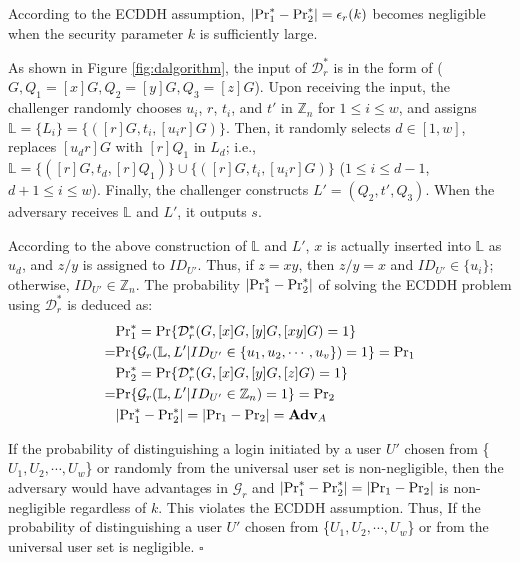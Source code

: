 {According to the ECDDH assumption,
    $|{\rm Pr}^*_1 - {\rm Pr}^*_2| = \epsilon_{r}(k)$ becomes negligible when the security parameter $k$ is sufficiently large.

As shown in Figure \ref{fig:dalgorithm}, the input of $\mathcal{D}^*_r$ is in the form of ($G, Q_1=[x]G, Q_2=[y]G, Q_3=[z]G$).
Upon receiving the input, the challenger randomly chooses $u_i$, $r$, $t_i$, and $t'$ in $\mathbb{Z}_n$ for $1 \leq i \leq w$, and assigns $\mathbb{L} = \{{L_i}\} = \{([r]G, t_i, [u_ir]G)\}$.
Then, it randomly selects $d \in [1,w]$, replaces $[u_dr]G$ with $[r]Q_1$ in $L_d$; i.e., $\mathbb{L} = \{([r]G, t_d, [r]Q_1)\} \cup \{([r]G, t_i, [u_ir]G)\}$ ($1 \leq i \leq d-1$, $d+1 \leq i \leq w$). Finally, the challenger constructs $L' = (Q_2, t', Q_3)$. When the adversary receives $\mathbb{L}$ and $L'$, it outputs $s$.


According to the above construction of $\mathbb{L}$ and $L'$,
 $x$ is actually inserted into $\mathbb{L}$ as $u_d$, and $z/y$ is assigned to $ID_{U'}$.
Thus, if $z = xy$, then $z/y = x$ and $ID_{U'} \in \{u_i\}$; otherwise, $ID_{U'} \in \mathbb{Z}_n$.
The probability $|{\rm Pr}^*_1 - {\rm Pr}^*_2|$ of solving the ECDDH problem using $\mathcal{D}^*_r$ is deduced as:
\begin{align*}
&{\rm Pr}^*_1 =  {\rm Pr}\{\mathcal{D}^*_r(G, [x]G, [y]G, [xy]G)=1\} \\=&{\rm Pr}\{\mathcal{G}_r(\mathbb{L}, L'|ID_{U'} \in \{u_1, u_2, \cdots, u_v\})=1\} = {\rm Pr}_1 \\
&{\rm Pr}^*_2= {\rm Pr}\{\mathcal{D}^*_r(G, [x]G, [y]G, [z]G)=1\} \\=&  {\rm Pr}\{\mathcal{G}_r(\mathbb{L}, L'|ID_{U'} \in \mathbb{Z}_n)=1\} = {\rm Pr}_2\\
&|{\rm Pr}^*_1-{\rm Pr}^*_2|=|{\rm Pr}_1-{\rm Pr}_2|={\mathbf{Adv}}_{A}
\end{align*}

If the probability of distinguishing a login initiated by a user $U'$ chosen from \{${U_1}, {U_2}, \cdots, {U_w}$\} or randomly from the universal user set is non-negligible,
    then the adversary would have advantages in $\mathcal{G}_r$ and $|{\rm Pr}^*_1-{\rm Pr}^*_2|=|{\rm Pr}_1-{\rm Pr}_2|$ is non-negligible regardless of $k$.
This violates the ECDDH assumption.
Thus, If the probability of distinguishing a user $U'$ chosen from \{${U_1}, {U_2}, \cdots, {U_w}$\} or from the universal user set is negligible.
\hfill $\square$


}
